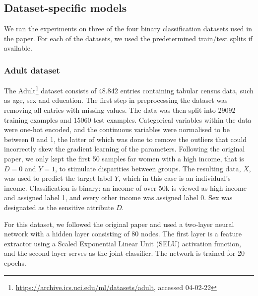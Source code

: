 \subsection{Dataset-specific models}

We ran the experiments on three of the four binary classification datasets used in the paper. For each of the datasets, we used the predetermined train/test splits if available.

\subsubsection{Adult dataset}

The Adult\footnote{\url{https://archive.ics.uci.edu/ml/datasets/adult}, accessed 04-02-22} dataset \citep{kohavi1996scaling} consists of 48.842 entries containing tabular census data, such as age, sex and education. The first step in preprocessing the dataset was removing all entries with missing values. The data was then split into 29092 training examples and 15060 test examples. Categorical variables within the data were one-hot encoded, and the continuous variables were normalised to be between 0 and 1, the latter of which was done to remove the outliers that could incorrectly skew the gradient learning of the parameters. Following the original paper, we only kept the first 50 samples for women with a high income, that is $D = 0$ and $Y = 1$, to stimulate disparities between groups. The resulting data, $X$, was used to predict the target label $Y$, which in this case is an individual's income. Classification is binary: an income of over 50k is viewed as high income and assigned label 1, and every other income was assigned label 0. Sex was designated as the sensitive attribute $D$. 

For this dataset, we followed the original paper and used a two-layer neural network with a hidden layer consisting of 80 nodes. The first layer is a feature extractor using a Scaled Exponential Linear Unit (SELU) activation function, and the second layer serves as the joint classifier. The network is trained for 20 epochs. 

